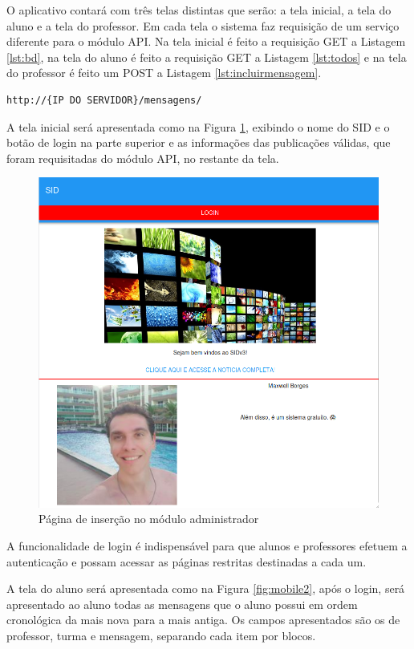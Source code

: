 O aplicativo contará com três telas distintas que serão: a tela inicial, a tela do aluno e a tela do professor. Em cada tela o sistema faz requisição de um serviço diferente para o módulo API. Na tela inicial é feito a requisição GET a Listagem \ref{lst:bd}, na tela do aluno é feito a requisição GET a Listagem \ref{lst:todos} e na tela do professor é feito um POST a Listagem \ref{lst:incluirmensagem}.

\begin{lstlisting}[caption={Incluir novas mensagens},label={lst:incluirmensagem}]
	http://{IP DO SERVIDOR}/mensagens/
\end{lstlisting}

A tela inicial será apresentada como na Figura \ref{fig:mobile1}, exibindo o nome do SID e o botão de login na parte superior e as informações das publicações válidas, que foram requisitadas do módulo API, no restante da tela.
\begin{figure}
\centering
\includegraphics[width=\textwidth]{figuras/mobile1}
\caption{Página de inserção no módulo administrador}
\label{fig:mobile1}
\end{figure}

A funcionalidade de login é indispensável para que alunos e professores efetuem a autenticação e possam acessar as páginas restritas destinadas a cada um.

A tela do aluno será apresentada como na Figura \ref{fig:mobile2}, após o login, será apresentado ao aluno todas as mensagens que o aluno possui em ordem cronológica da mais nova para a mais antiga. Os campos apresentados são os de professor, turma e mensagem, separando cada item por blocos.

